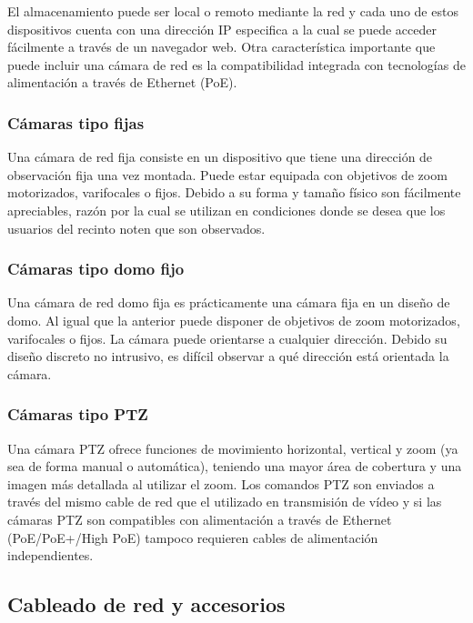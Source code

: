 El almacenamiento puede ser local o remoto mediante la red y cada uno de estos dispositivos cuenta con una dirección IP especifica a la cual se puede acceder fácilmente a través de un navegador web. Otra característica importante que puede incluir una cámara de red es la compatibilidad integrada con tecnologías de alimentación a través de Ethernet (PoE). \cite{Axis}


\subsubsection{Cámaras tipo fijas}

Una cámara de red fija consiste en un dispositivo que tiene una dirección de observación fija una vez montada. Puede estar equipada con objetivos de zoom motorizados, varifocales o fijos. Debido a su forma y tamaño físico son fácilmente apreciables, razón por la cual se utilizan en condiciones donde se desea que los usuarios del recinto noten que son observados.  \cite{Axis}



\subsubsection{Cámaras tipo domo fijo}

Una cámara de red domo fija es prácticamente una cámara fija en un diseño de domo. Al igual que la anterior puede disponer de objetivos de zoom motorizados, varifocales o fijos. La cámara puede orientarse a cualquier dirección. Debido su diseño discreto no intrusivo, es difícil observar a qué dirección está orientada la cámara. \cite{Axis}


\subsubsection{Cámaras tipo PTZ}

Una cámara PTZ ofrece funciones de movimiento horizontal, vertical y zoom (ya sea de forma manual o automática), teniendo una mayor área de cobertura y una imagen más detallada al utilizar el zoom. Los comandos PTZ son enviados a través del mismo cable de red que el utilizado en transmisión de vídeo y si las cámaras PTZ son compatibles con alimentación a través de Ethernet (PoE/PoE+/High PoE) tampoco requieren cables de alimentación independientes. \cite{Axis}



\subsection{Cableado de red y accesorios}


